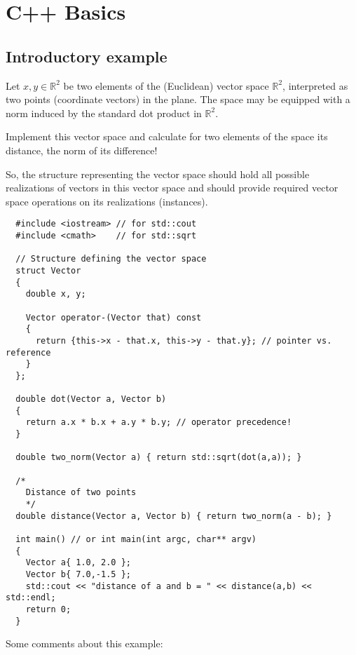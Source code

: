 \chapter{C++ Basics\label{sec:basics}}
\section{Introductory example\label{sec:introductory-example}}

Let $x,y\in \mathbb{R}^2$ be two elements of the (Euclidean) vector space $\mathbb{R}^2$, interpreted as
two points (coordinate vectors) in the plane. The space may be equipped with a norm induced by the standard
dot product in $\mathbb{R}^2$.

Implement this vector space and calculate for two elements of the space its distance, \ie the norm of its difference!

So, the structure representing the vector space should hold all possible realizations of vectors in this vector space
and should provide required vector space operations on its realizations (instances).


\begin{verbatim}
  #include <iostream> // for std::cout
  #include <cmath>    // for std::sqrt

  // Structure defining the vector space
  struct Vector
  {
    double x, y;

    Vector operator-(Vector that) const
    {
      return {this->x - that.x, this->y - that.y}; // pointer vs. reference
    }
  };

  double dot(Vector a, Vector b)
  {
    return a.x * b.x + a.y * b.y; // operator precedence!
  }

  double two_norm(Vector a) { return std::sqrt(dot(a,a)); }

  /*
    Distance of two points
    */
  double distance(Vector a, Vector b) { return two_norm(a - b); }

  int main() // or int main(int argc, char** argv)
  {
    Vector a{ 1.0, 2.0 };
    Vector b{ 7.0,-1.5 };
    std::cout << "distance of a and b = " << distance(a,b) << std::endl;
    return 0;
  }
\end{verbatim}

Some comments about this example:

